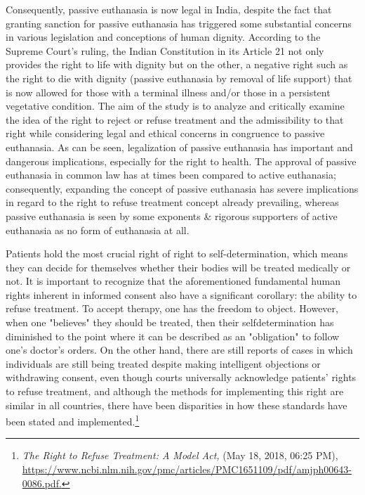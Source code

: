 \begin{multicols}{2}

\noi
Consequently, passive euthanasia is now legal in India, despite the fact that granting sanction
for passive euthanasia has triggered some substantial concerns in various legislation and
conceptions of human dignity. According to the Supreme Court's ruling, the Indian
Constitution in its Article 21 not only provides the right to life with dignity but on the other, a
negative right such as the right to die with dignity (passive euthanasia by removal of life
support) that is now allowed for those with a terminal illness and/or those in a persistent
vegetative condition. The aim of the study is to analyze and critically examine the idea of the
right to reject or refuse treatment and the admissibility to that right while considering legal
and ethical concerns in congruence to passive euthanasia. As can be seen, legalization of
passive euthanasia has important and dangerous implications, especially for the right to
health. The approval of passive euthanasia in common law has at times been compared to
active euthanasia; consequently, expanding the concept of passive euthanasia has severe
implications in regard to the right to refuse treatment concept already prevailing, whereas
passive euthanasia is seen by some exponents \& rigorous supporters of active euthanasia as
no form of euthanasia at all.


\noi
Patients hold the most crucial right of right to self-determination, which means they can
decide for themselves whether their bodies will be treated medically or not. It is important to
recognize that the aforementioned fundamental human rights inherent in informed consent
also have a significant corollary: the ability to refuse treatment. To accept therapy, one has
the freedom to object. However, when one "believes" they should be treated, then their selfdetermination has diminished to the point where it can be described as an "obligation" to
follow one's doctor's orders. On the other hand, there are still reports of cases in which
individuals are still being treated despite making intelligent objections or withdrawing
consent, even though courts universally acknowledge patients' rights to refuse treatment, and
although the methods for implementing this right are similar in all countries, there have been
disparities in how these standards have been stated and implemented.\footnote{\textit{The Right to Refuse Treatment: A Model Act,} (May 18, 2018, 06:25 PM), \url{https://www.ncbi.nlm.nih.gov/pmc/articles/PMC1651109/pdf/amjph00643-0086.pdf.}}


\end{multicols}
